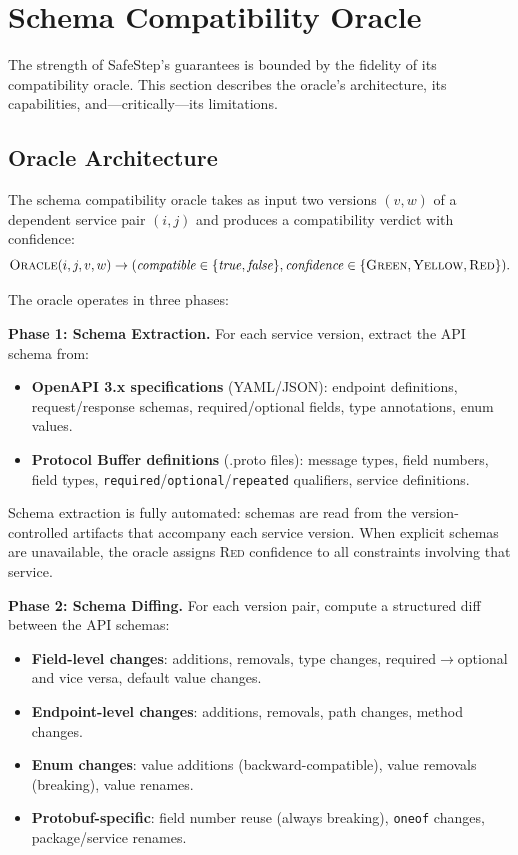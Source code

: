 \documentclass[10pt,twocolumn]{article}
\begin{document}
\section{Schema Compatibility Oracle}
\label{sec:oracle}

The strength of SafeStep's guarantees is bounded by the fidelity of its compatibility oracle. This section describes the oracle's architecture, its capabilities, and---critically---its limitations.

\subsection{Oracle Architecture}
\label{sec:oracle-arch}

The schema compatibility oracle takes as input two versions $(v, w)$ of a dependent service pair $(i, j)$ and produces a compatibility verdict with confidence:
\[
  \textsc{Oracle}(i, j, v, w) \to (\mathit{compatible} \in \{\mathit{true}, \mathit{false}\}, \mathit{confidence} \in \{\textsc{Green}, \textsc{Yellow}, \textsc{Red}\}).
\]

The oracle operates in three phases:

\textbf{Phase 1: Schema Extraction.} For each service version, extract the API schema from:
\begin{itemize}
\item \textbf{OpenAPI 3.x specifications} (YAML/JSON): endpoint definitions, request/response schemas, required/optional fields, type annotations, enum values.
\item \textbf{Protocol Buffer definitions} (.proto files): message types, field numbers, field types, \texttt{required}/\texttt{optional}/\texttt{repeated} qualifiers, service definitions.
\end{itemize}
Schema extraction is fully automated: schemas are read from the version-controlled artifacts that accompany each service version. When explicit schemas are unavailable, the oracle assigns \textsc{Red} confidence to all constraints involving that service.

\textbf{Phase 2: Schema Diffing.} For each version pair, compute a structured diff between the API schemas:
\begin{itemize}
\item \textbf{Field-level changes}: additions, removals, type changes, required$\to$optional and vice versa, default value changes.
\item \textbf{Endpoint-level changes}: additions, removals, path changes, method changes.
\item \textbf{Enum changes}: value additions (backward-compatible), value removals (breaking), value renames.
\item \textbf{Protobuf-specific}: field number reuse (always breaking), \texttt{oneof} changes, package/service renames.
\end{itemize}
\end{document}
